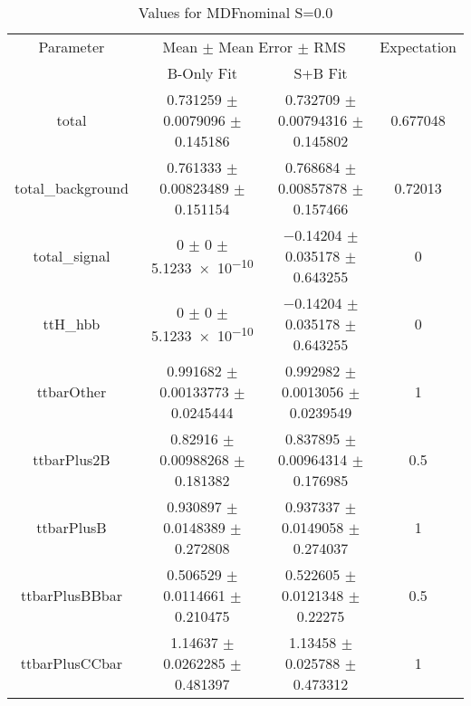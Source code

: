 \begin{table}
\centering
\caption{Values for MDFnominal S=0.0}
\begin{tabular}{cccc}
\toprule
Parameter & \multicolumn{2}{c}{Mean $\pm$ Mean Error $\pm$ RMS} & Expectation\\
 & B-Only Fit & S+B Fit & \\
\midrule
total & \num{0.731259} $\pm$ \num{0.0079096} $\pm$ \num{0.145186} & \num{0.732709} $\pm$ \num{0.00794316} $\pm$ \num{0.145802} & \num{0.677048}\\
total\_background & \num{0.761333} $\pm$ \num{0.00823489} $\pm$ \num{0.151154} & \num{0.768684} $\pm$ \num{0.00857878} $\pm$ \num{0.157466} & \num{0.72013}\\
total\_signal & \num{0} $\pm$ \num{0} $\pm$ \num{5.1233e-10} & \num{-0.14204} $\pm$ \num{0.035178} $\pm$ \num{0.643255} & \num{0}\\
ttH\_hbb & \num{0} $\pm$ \num{0} $\pm$ \num{5.1233e-10} & \num{-0.14204} $\pm$ \num{0.035178} $\pm$ \num{0.643255} & \num{0}\\
ttbarOther & \num{0.991682} $\pm$ \num{0.00133773} $\pm$ \num{0.0245444} & \num{0.992982} $\pm$ \num{0.0013056} $\pm$ \num{0.0239549} & \num{1}\\
ttbarPlus2B & \num{0.82916} $\pm$ \num{0.00988268} $\pm$ \num{0.181382} & \num{0.837895} $\pm$ \num{0.00964314} $\pm$ \num{0.176985} & \num{0.5}\\
ttbarPlusB & \num{0.930897} $\pm$ \num{0.0148389} $\pm$ \num{0.272808} & \num{0.937337} $\pm$ \num{0.0149058} $\pm$ \num{0.274037} & \num{1}\\
ttbarPlusBBbar & \num{0.506529} $\pm$ \num{0.0114661} $\pm$ \num{0.210475} & \num{0.522605} $\pm$ \num{0.0121348} $\pm$ \num{0.22275} & \num{0.5}\\
ttbarPlusCCbar & \num{1.14637} $\pm$ \num{0.0262285} $\pm$ \num{0.481397} & \num{1.13458} $\pm$ \num{0.025788} $\pm$ \num{0.473312} & \num{1}\\
\bottomrule
\end{tabular}
\end{table}